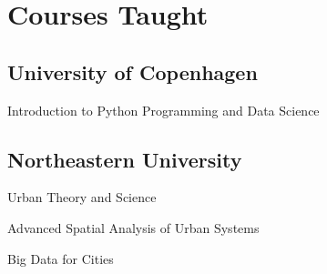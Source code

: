 \documentclass[11pt,letterpaper]{report}
\newcommand{\listitemspace}{0.25em}
\renewenvironment{itemize}
{\begin{list}{}{\setlength{\leftmargin}{0em}
                \setlength{\parskip}{0em}
                \setlength{\itemsep}{\listitemspace}
                \setlength{\parsep}{\listitemspace}}}
{\end{list}}
\begin{document}
    \begin{tablist}




    \end{tablist}



    \section*{Courses Taught}

    \subsection*{University of Copenhagen}

    \begin{itemize}

        \item Introduction to Python Programming and Data Science

    \end{itemize}

    \subsection*{Northeastern University}

    \begin{itemize}

        \item Urban Theory and Science
        \item Advanced Spatial Analysis of Urban Systems
        \item Big Data for Cities

    \end{itemize}
\end{document}

